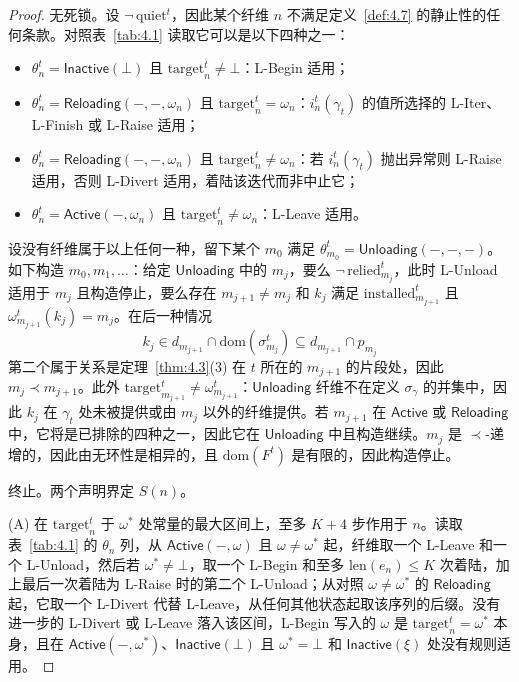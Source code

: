 \begin{proof}
无死锁。设 $\lnot\,\mathrm{quiet}^t$，因此某个纤维 $n$ 不满足定义~\ref{def:4.7} 的静止性的任何条款。对照表~\ref{tab:4.1} 读取它可以是以下四种之一：
\begin{itemize}
\item $\theta^t_n = \mathsf{Inactive}(\bot)$ 且 $\mathrm{target}^t_n \neq \bot$：L-Begin 适用；
\item $\theta^t_n = \mathsf{Reloading}(-, -, \omega_n)$ 且 $\mathrm{target}^t_n = \omega_n$：$i^t_n(\gamma_t)$ 的值所选择的 L-Iter、L-Finish 或 L-Raise 适用；
\item $\theta^t_n = \mathsf{Reloading}(-, -, \omega_n)$ 且 $\mathrm{target}^t_n \neq \omega_n$：若 $i^t_n(\gamma_t)$ 抛出异常则 L-Raise 适用，否则 L-Divert 适用，着陆该迭代而非中止它；
\item $\theta^t_n = \mathsf{Active}(-, \omega_n)$ 且 $\mathrm{target}^t_n \neq \omega_n$：L-Leave 适用。
\end{itemize}
设没有纤维属于以上任何一种，留下某个 $m_0$ 满足 $\theta^t_{m_0} = \mathsf{Unloading}(-, -, -)$。如下构造 $m_0, m_1, \ldots$：给定 $\mathsf{Unloading}$ 中的 $m_j$，要么 $\lnot\,\mathrm{relied}^t_{m_j}$，此时 L-Unload 适用于 $m_j$ 且构造停止，要么存在 $m_{j+1} \neq m_j$ 和 $k_j$ 满足 $\mathrm{installed}^t_{m_{j+1}}$ 且 $\omega^t_{m_{j+1}}(k_j) = m_j$。在后一种情况
\[
k_j \in d_{m_{j+1}} \cap \mathrm{dom}(\sigma^t_{m_j}) \subseteq d_{m_{j+1}} \cap p_{m_j}
\]
第二个属于关系是定理~\ref{thm:4.3}(3) 在 $t$ 所在的 $m_{j+1}$ 的片段处，因此 $m_j \prec m_{j+1}$。此外 $\mathrm{target}^t_{m_{j+1}} \neq \omega^t_{m_{j+1}}$：$\mathsf{Unloading}$ 纤维不在定义 $\sigma_\gamma$ 的并集中，因此 $k_j$ 在 $\gamma_t$ 处未被提供或由 $m_j$ 以外的纤维提供。若 $m_{j+1}$ 在 $\mathsf{Active}$ 或 $\mathsf{Reloading}$ 中，它将是已排除的四种之一，因此它在 $\mathsf{Unloading}$ 中且构造继续。$m_j$ 是 $\prec$-递增的，因此由无环性是相异的，且 $\mathrm{dom}(F^t)$ 是有限的，因此构造停止。

终止。两个声明界定 $S(n)$。

(A) 在 $\mathrm{target}^t_n$ 于 $\omega^*$ 处常量的最大区间上，至多 $K + 4$ 步作用于 $n$。读取表~\ref{tab:4.1} 的 $\theta_n$ 列，从 $\mathsf{Active}(-, \omega)$ 且 $\omega \neq \omega^*$ 起，纤维取一个 L-Leave 和一个 L-Unload，然后若 $\omega^* \neq \bot$，取一个 L-Begin 和至多 $\mathrm{len}(e_n) \leqslant K$ 次着陆，加上最后一次着陆为 L-Raise 时的第二个 L-Unload；从对照 $\omega \neq \omega^*$ 的 $\mathsf{Reloading}$ 起，它取一个 L-Divert 代替 L-Leave，从任何其他状态起取该序列的后缀。没有进一步的 L-Divert 或 L-Leave 落入该区间，L-Begin 写入的 $\omega$ 是 $\mathrm{target}^t_n = \omega^*$ 本身，且在 $\mathsf{Active}(-, \omega^*)$、$\mathsf{Inactive}(\bot)$ 且 $\omega^* = \bot$ 和 $\mathsf{Inactive}(\xi)$ 处没有规则适用。


\end{proof}
